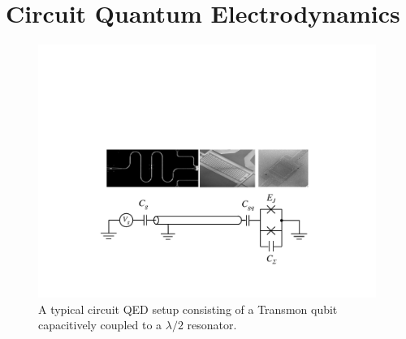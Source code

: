 \section{Circuit Quantum Electrodynamics}

\begin{figure}
	\includegraphics[width=11cm]{"./material/figures/introduction/cqed/cqed"}
	\caption{A typical circuit QED setup consisting of a Transmon qubit capacitively coupled to a $\lambda/2$ resonator.}
	\label{fig:CQED}
\end{figure}


